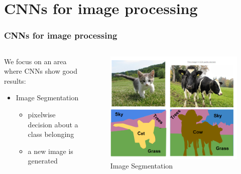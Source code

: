 \documentclass[18pt]{beamer}
\begin{document}
\section{CNNs for image processing}
\begin{frame}
  \frametitle{CNNs for image processing}

  \begin{columns}
    \begin{column}{0.5\textwidth}
      We focus on an area where CNNs show good results:
      \begin{itemize}
      \item Image Segmentation
        \begin{itemize}
        \item pixelwise decision about a class belonging
        \item a new image is generated
        \end{itemize}
      \end{itemize}
    \end{column}
    
    \begin{column}{0.5\textwidth}
      \begin{center}
        \begin{figure}
          \centering
          \includegraphics[scale=0.35]{images/segm}
          \caption{Image Segmentation\footnotemark}
        \end{figure}
      \end{center}
    \end{column}
  \end{columns}


\end{frame}
\end{document}
